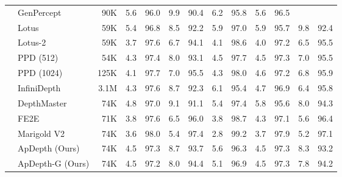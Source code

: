 \begin{table}[!t]
\begin{tabular}{@{}llrrrrrrrrrrr@{}}
		               & GenPercept~\cite{xu2024genpercept}         & 90K      & 5.6 & 96.0 & 9.9 & 90.4 & 6.2 & 95.8 & 5.6 & 96.5 & \textemdash & \textemdash \\
		               & Lotus~\cite{he2025lotus}                   & 59K      & 5.4 & 96.8 & 8.5 & 92.2 & 5.9 & 97.0 & 5.9 & 95.7 & 9.8 & 92.4 \\
		               & Lotus-2~\cite{he2025lotus2}                & 59K      & 3.7 & 97.6 & 6.7 & 94.1 & 4.1 & 98.6 & 4.0 & 97.2 & 6.5 & 95.5 \\
		               & PPD (512)~\cite{xu2025pixel}               & 54K      & 4.3 & 97.4 & 8.0 & 93.1 & 4.5 & 97.7 & 4.5 & 97.3 & 7.0 & 95.5 \\
		               & PPD (1024)~\cite{xu2025pixel}              & 125K     & 4.1 & 97.7 & 7.0 & 95.5 & 4.3 & 98.0 & 4.6 & 97.2 & 6.8 & 95.9 \\
		               & InfiniDepth~\cite{yu2026infinidepth}       & 3.1M     & 4.3 & 97.6 & 8.7 & 92.3 & 6.1 & 95.4 & 4.7 & 96.9 & 6.4 & 95.8 \\
		               & DepthMaster~\cite{song2026depthmaster}     & 74K      & 4.8 & 97.0 & 9.1 & 91.1 & 5.4 & 97.4 & 5.8 & 95.6 & 8.0 & 94.3 \\
		               & FE2E~\cite{wang2026fe2e}                   & 71K      & 3.8 & 97.6 & 6.5 & 96.0 & 3.8 & 98.7 & 4.3 & 97.1 & 5.6 & 96.4 \\
		               & Marigold V2~\cite{pavlovic2026marigoldv2} & 74K      & 3.6 & 98.0 & 5.4 & 97.4 & 2.8 & 99.2 & 3.7 & 97.9 & 5.2 & 97.1 \\
		\midrule
		               & ApDepth (Ours)~\cite{wang2026apdepth}      & 74K      & 4.5 & 97.3 & 8.7 & 93.7 & 5.6 & 96.3 & 4.5 & 97.3 & 8.3 & 93.2 \\
		               & ApDepth-G (Ours)                           & 74K      & 4.5 & 97.2 & 8.0 & 94.4 & 5.1 & 96.9 & 4.5 & 97.3 & 7.8 & 94.2 \\
		\bottomrule
	\end{tabular}
\end{table}
